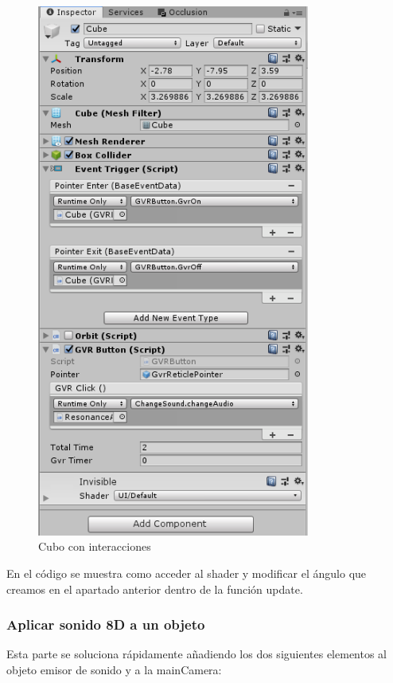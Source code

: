 \begin{figure}[htb]
	\centering
	\includegraphics[width=0.8\textwidth]{./imagenes/cube}
	\caption{Cubo con interacciones}
\end{figure}
\FloatBarrier

\quad En el código se muestra como acceder al shader y modificar el ángulo que creamos en el apartado anterior dentro de la función update.\\

\subsubsection{Aplicar sonido 8D a un objeto}

\quad Esta parte se soluciona rápidamente añadiendo los dos siguientes elementos al objeto emisor de sonido y a la mainCamera:\\

